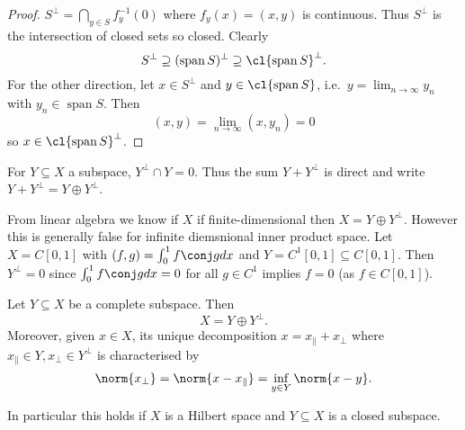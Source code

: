 \documentclass[a4paper]{article}
\DeclareMathOperator{\spans}{span} %
\begin{document}
\begin{proof}
  \(S^\perp = \bigcap_{y \in S} f^{-1}_y(0)\) where \(f_y(x) = (x, y)\) is continuous. Thus \(S^\perp\) is the intersection of closed sets so closed. Clearly
  \[
    S^\perp \supseteq (\spans S)^\perp \supseteq \cl{\spans S}^\perp.
  \]
  For the other direction, let \(x \in S^\perp\) and \(y \in \cl{\spans S}\), i.e.\ \(y = \lim_{n \to \infty} y_n\) with \(y_n \in \spans S\). Then
  \[
    (x, y) = \lim_{n \to \infty} (x, y_n) = 0
  \]
  so \(x \in \cl{\spans S}^\perp\).
\end{proof}

\begin{notation}
  For \(Y \subseteq X\) a subspace, \(Y^\perp \cap Y = 0\). Thus the sum \(Y + Y^\perp\) is direct and write \(Y + Y^\perp = Y \oplus Y^\perp\).
\end{notation}

\begin{eg}
  From linear algebra we know if \(X\) if finite-dimensional then \(X = Y \oplus Y^\perp\). However this is generally false for infinite diemsnional inner product space. Let \(X = C[0, 1]\) with \((f, g) = \int_0^1 f \conj g dx\) and \(Y = C^1[0, 1] \subseteq C[0, 1]\). Then \(Y^\perp = 0\) since \(\int_0^1 f \conj g dx = 0\) for all \(g \in C^1\) implies \(f = 0\) (as \(f \in C[0, 1]\)).
\end{eg}

\begin{theorem}
  \label{thm:orthogonal decomposition}
  Let \(Y \subseteq X\) be a complete subspace. Then
  \[
    X = Y \oplus Y^\perp.
  \]
  Moreover, given \(x \in X\), its unique decomposition \(x = x_\parallel + x_\perp\) where \(x_\parallel \in Y, x_\perp \in Y^\perp\) is characterised by
  \[
    \norm{x_\perp} = \norm{x - x_\parallel} = \inf_{y \in Y} \norm{x - y}.
  \]
\end{theorem}

In particular this holds if \(X\) is a Hilbert space and \(Y \subseteq X\) is a closed subspace.
\end{document}
